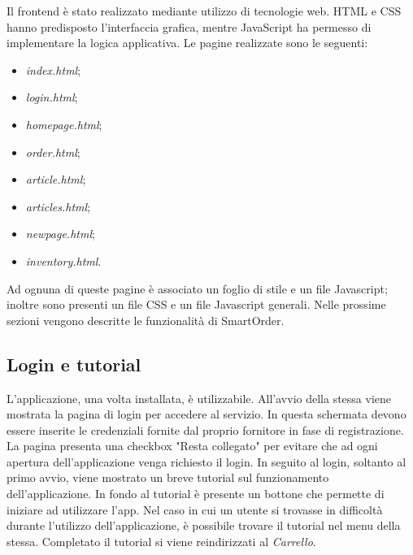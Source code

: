 \documentclass[12pt, a4paper, titlepage]{report}
\begin{document}
	Il frontend è stato realizzato mediante utilizzo di tecnologie web. HTML e CSS hanno predisposto l'interfaccia grafica, mentre JavaScript ha permesso di implementare la logica applicativa.
	Le pagine realizzate sono le seguenti:
	\begin{itemize}
		\item \textit{index.html};
		\item \textit{login.html};
		\item \textit{homepage.html};
		\item \textit{order.html};
		\item \textit{article.html};
		\item \textit{articles.html};
		\item \textit{newpage.html};
		\item \textit{inventory.html}.
	\end{itemize}
	Ad ognuna di queste pagine è associato un foglio di stile e un file Javascript; inoltre sono presenti un file CSS e un file Javascript generali. Nelle prossime sezioni vengono descritte le funzionalità di SmartOrder.
	
	\subsection{Login e tutorial}
	
	L'applicazione, una volta installata, è utilizzabile. All'avvio della stessa viene mostrata la pagina di login per accedere al servizio. In questa schermata devono essere inserite le credenziali fornite dal proprio fornitore in fase di registrazione. La pagina presenta una checkbox "Resta collegato" per evitare che ad ogni apertura dell'applicazione venga richiesto il login. In seguito al login, soltanto al primo avvio, viene mostrato un breve tutorial sul funzionamento dell'applicazione. In fondo al tutorial è presente un bottone che permette di iniziare ad utilizzare l'app. Nel caso in cui un utente si trovasse in difficoltà durante l'utilizzo dell'applicazione, è possibile trovare il tutorial nel menu della stessa. Completato il tutorial si viene reindirizzati al \textit{Carrello}.
	
\end{document}
